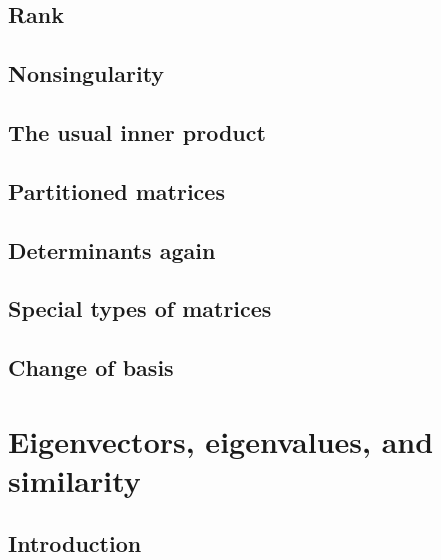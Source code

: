 \documentclass[a4paper]{article}
\newcommand{\todobox}{\textcolor{red}{\fbox{\phantom{--}}}}
\begin{document}
\subsection{Rank}
\todobox
\subsection{Nonsingularity}
\todobox
\subsection{The usual inner product}
\todobox
\subsection{Partitioned matrices}
\todobox
\subsection{Determinants again}
\todobox
\subsection{Special types of matrices}
\todobox
\subsection{Change of basis}
\todobox

\subsubsection{}


\newpage
\section{Eigenvectors, eigenvalues, and similarity}
\setcounter{subsection}{-1}
\subsection{Introduction}
\todobox
\end{document}
